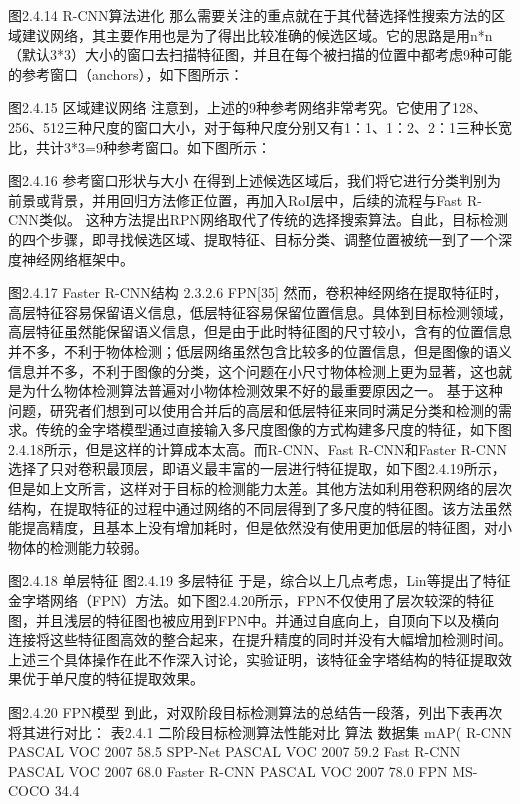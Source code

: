 图2.4.14 R-CNN算法进化
那么需要关注的重点就在于其代替选择性搜索方法的区域建议网络，其主要作用也是为了得出比较准确的候选区域。它的思路是用n*n（默认3*3）大小的窗口去扫描特征图，并且在每个被扫描的位置中都考虑9种可能的参考窗口（anchors），如下图所示：

图2.4.15 区域建议网络
注意到，上述的9种参考网络非常考究。它使用了128、256、512三种尺度的窗口大小，对于每种尺度分别又有1：1、1：2、2：1三种长宽比，共计3*3=9种参考窗口。如下图所示：

图2.4.16 参考窗口形状与大小
在得到上述候选区域后，我们将它进行分类判别为前景或背景，并用回归方法修正位置，再加入RoI层中，后续的流程与Fast R-CNN类似。
	这种方法提出RPN网络取代了传统的选择搜索算法。自此，目标检测的四个步骤，即寻找候选区域、提取特征、目标分类、调整位置被统一到了一个深度神经网络框架中。

图2.4.17 Faster R-CNN结构
2.3.2.6 FPN[35]
然而，卷积神经网络在提取特征时，高层特征容易保留语义信息，低层特征容易保留位置信息。具体到目标检测领域，高层特征虽然能保留语义信息，但是由于此时特征图的尺寸较小，含有的位置信息并不多，不利于物体检测；低层网络虽然包含比较多的位置信息，但是图像的语义信息并不多，不利于图像的分类，这个问题在小尺寸物体检测上更为显著，这也就是为什么物体检测算法普遍对小物体检测效果不好的最重要原因之一。
基于这种问题，研究者们想到可以使用合并后的高层和低层特征来同时满足分类和检测的需求。传统的金字塔模型通过直接输入多尺度图像的方式构建多尺度的特征，如下图2.4.18所示，但是这样的计算成本太高。而R-CNN、Fast R-CNN和Faster R-CNN选择了只对卷积最顶层，即语义最丰富的一层进行特征提取，如下图2.4.19所示，但是如上文所言，这样对于目标的检测能力太差。其他方法如利用卷积网络的层次结构，在提取特征的过程中通过网络的不同层得到了多尺度的特征图。该方法虽然能提高精度，且基本上没有增加耗时，但是依然没有使用更加低层的特征图，对小物体的检测能力较弱。
    
图2.4.18	  单层特征						图2.4.19 多层特征
于是，综合以上几点考虑，Lin等提出了特征金字塔网络（FPN）方法。如下图2.4.20所示，FPN不仅使用了层次较深的特征图，并且浅层的特征图也被应用到FPN中。并通过自底向上，自顶向下以及横向连接将这些特征图高效的整合起来，在提升精度的同时并没有大幅增加检测时间。上述三个具体操作在此不作深入讨论，实验证明，该特征金字塔结构的特征提取效果优于单尺度的特征提取效果。

图2.4.20 FPN模型
到此，对双阶段目标检测算法的总结告一段落，列出下表再次将其进行对比：
表2.4.1 二阶段目标检测算法性能对比
算法	数据集	mAP(%
R-CNN	PASCAL VOC 2007	58.5
SPP-Net	PASCAL VOC 2007	59.2
Fast R-CNN	PASCAL VOC 2007	68.0
Faster R-CNN	PASCAL VOC 2007	78.0
FPN	MS-COCO	34.4

